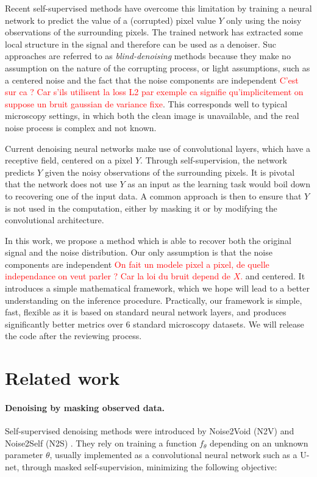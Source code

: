 \documentclass{article}
\begin{document}
Recent self-supervised methods have overcome this limitation \cite{batson2019noise2self,krull2018noise2void} by training a neural network to predict the value of a (corrupted) pixel value $Y$ only using the noisy observations of the surrounding pixels. The trained network has extracted some local structure in the signal and therefore can be used as a denoiser. Suc approaches are referred to as \textit{blind-denoising} methods because they make no assumption on the nature of the corrupting process, or light assumptions, such as a centered noise and the fact that the noise components are independent \textcolor{red}{C'est sur ca ? Car s'ils utilisent la loss L2 par exemple ca signifie qu'implicitement on suppose un bruit gaussian de variance fixe}. This corresponds well to typical microscopy settings, in which both the clean image is unavailable, and the real noise process is complex and not known.

Current denoising neural networks make use of convolutional layers, which have a receptive field, centered on a pixel $Y$. Through self-supervision, the network predicts $Y$ given the noisy observations of the surrounding pixels. It is pivotal that the network does not use $Y$ as an input as the learning task would boil down to recovering one of the input data. A common approach is then to ensure that $Y$ is not used in the computation, either by masking it or by modifying the convolutional architecture.

In this work, we propose a method which is able to recover both the original signal and the noise distribution. Our only assumption is that the noise components are independent \textcolor{red}{On fait un modele pixel a pixel, de quelle independance on veut parler ? Car la loi du bruit depend de $X$.} and centered. It introduces a simple mathematical framework, which we hope will lead to a better understanding on the inference procedure. Practically, our framework is simple, fast, flexible as it is based on standard neural network layers, and produces significantly better metrics over 6 standard microscopy datasets. We will release the code after the reviewing process.

\section{Related work}
\label{sec:related}
\paragraph{Denoising by masking observed data.}
Self-supervised denoising methods were introduced by Noise2Void (N2V) \cite{krull2018noise2void} and Noise2Self (N2S) \cite{batson2019noise2self}. They rely on training a function $f_\theta$ depending on an unknown parameter $\theta$, usually  implemented as a convolutional neural network such as  a U-net, through masked self-supervision, minimizing the following objective:
\end{document}
